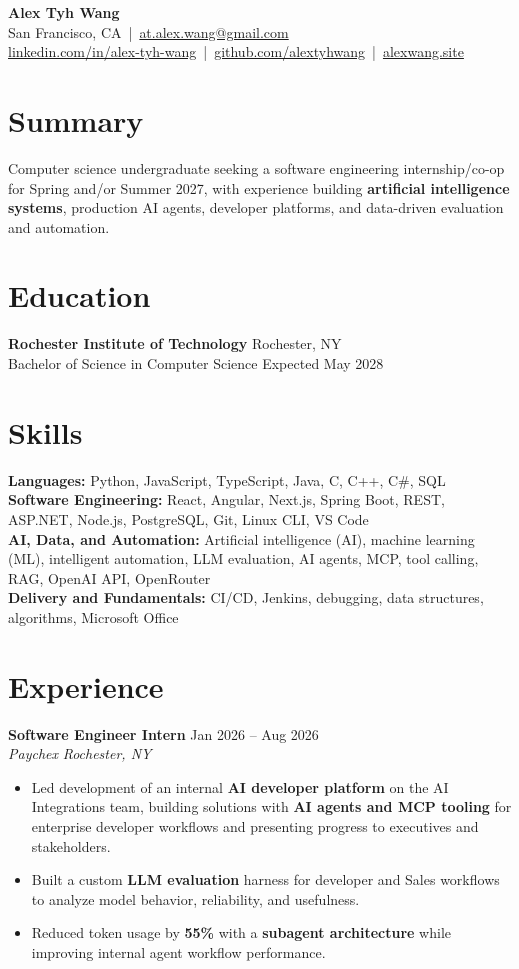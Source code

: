 \documentclass[10pt,letterpaper]{article}
\newif\ifresumeFirstRole
\newcommand{\resumeRole}[4]{%
  \ifresumeFirstRole
    \global\resumeFirstRolefalse
  \else
    \vspace{0pt plus 1fill}%
  \fi
  \textbf{#1} \hfill #2\\
  \textit{#3} \hfill \textit{#4}
}
\begin{document}
\begin{center}
{\Large \textbf{Alex Tyh Wang}}\\
San Francisco, CA \,|\, \href{mailto:at.alex.wang@gmail.com}{at.alex.wang@gmail.com}\\
\small \href{https://www.linkedin.com/in/alex-tyh-wang/}{linkedin.com/in/alex-tyh-wang} \,|\, \href{https://github.com/alextyhwang}{github.com/alextyhwang} \,|\, \href{https://alexwang.site}{alexwang.site}
\end{center}

\section*{Summary}
Computer science undergraduate seeking a software engineering internship/co-op for Spring and/or Summer 2027, with experience building \textbf{artificial intelligence systems}, production AI agents, developer platforms, and data-driven evaluation and automation.

\section*{Education}
\textbf{Rochester Institute of Technology} \hfill Rochester, NY\\
Bachelor of Science in Computer Science \hfill Expected May 2028

\section*{Skills}
\textbf{Languages:} Python, JavaScript, TypeScript, Java, C, C++, C\#, SQL\\
\textbf{Software Engineering:} React, Angular, Next.js, Spring Boot, REST, ASP.NET, Node.js, PostgreSQL, Git, Linux CLI, VS Code\\
\textbf{AI, Data, and Automation:} Artificial intelligence (AI), machine learning (ML), intelligent automation, LLM evaluation, AI agents, MCP, tool calling, RAG, OpenAI API, OpenRouter\\
\textbf{Delivery and Fundamentals:} CI/CD, Jenkins, debugging, data structures, algorithms, Microsoft Office

\section*{Experience}
\resumeRole{Software Engineer Intern}{Jan 2026 -- Aug 2026}{Paychex}{Rochester, NY}
\begin{itemize}
  \item Led development of an internal \textbf{AI developer platform} on the AI Integrations team, building solutions with \textbf{AI agents and MCP tooling} for enterprise developer workflows and presenting progress to executives and stakeholders.
  \item Built a custom \textbf{LLM evaluation} harness for developer and Sales workflows to analyze model behavior, reliability, and usefulness.
  \item Reduced token usage by \textbf{55\%} with a \textbf{subagent architecture} while improving internal agent workflow performance.
\end{itemize}
\end{document}
